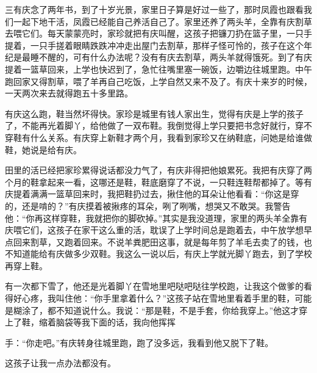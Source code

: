 \documentclass[12pt,UTF8]{ctexbook}
\begin{document}
三有庆念了两年书，到了十岁光景，家里日子算是好过一些了，那时凤霞也跟看我们一起下地干活，凤霞已经能自己养活自己了。家里还养了两头羊，全靠有庆割草去喂它们。每天蒙蒙亮时，家珍就把有庆叫醒，这孩子把镰刀扔在篮子里，一只手提着，一只手搓着眼睛跌跌冲冲走出屋门去割草，那样子怪可怜的，孩子在这个年纪是最睡不醒的，可有什么办法呢？没有有庆去割草，两头羊就得饿死。到了有庆提着一篮草回来，上学也快迟到了，急忙往嘴里塞一碗饭，边嚼边往城里跑。中午跑回家又得割草，喂了羊再自己吃饭，上学自然又来不及了。有庆十来岁的时候，一天两次来去就得跑五十多里路。

有庆这么跑，鞋当然坏得快。家珍是城里有钱人家出生，觉得有庆是上学的孩子了，不能再光着脚丫，给他做了一双布鞋。我倒觉得上学只要把书念好就行，穿不穿鞋有什么关系。有庆穿上新鞋才两个月，我看到家珍又在纳鞋底，问她是给谁做鞋，她说是给有庆。

田里的活已经把家珍累得说话都没力气了，有庆非得把他娘累死。我把有庆穿了两个月的鞋拿起来一看，这哪还是鞋，鞋底磨穿了不说，一只鞋连鞋帮都掉了。等有庆提着满满一篮草回来时，我把鞋扔过去，揪住他的耳朵让他看看：“你这是穿的，还是啃的？”有庆摸着被揪疼的耳朵，咧了咧嘴，想哭又不敢哭。我警告他：“你再这样穿鞋，我就把你的脚砍掉。”其实是我没道理，家里的两头羊全靠有庆喂它们，这孩子在家干这么重的活，耽误了上学时间总是跑着去，中午放学想早点回来割草，又跑着回来。不说羊粪肥田这事，就是每年剪了羊毛去卖了的钱，也不知道能给有庆做多少双鞋。我这么一说以后，有庆上学就光脚丫跑去，到了学校再穿上鞋。

有一次都下雪了，他还是光着脚丫在雪地里吧哒吧哒往学校跑，让我这个做爹的看得好心疼，我叫住他：“你手里拿着什么？”这孩子站在雪地里看着手里的鞋，可能是糊涂了，都不知道说什么。我说：“那是鞋，不是手套，你给我穿上。”他这才穿上了鞋，缩着脑袋等我下面的话，我向他挥挥


手：“你走吧。”有庆转身往城里跑，跑了没多远，我看到他又脱下了鞋。

这孩子让我一点办法都没有。
\end{document}
